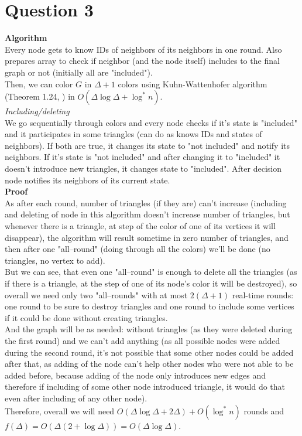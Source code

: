 \documentclass[]{article}
\title{}
\author{}
\begin{document}

\section*{Question 3}
	\textbf{Algorithm}\\
	Every node gets to know IDs of neighbors of its neighbors in one round. Also prepares array to check if neighbor (and the node itself) includes to the final graph or not (initially all are "included").\\
	Then, we can color $G$ in $\Delta+1$ colors using Kuhn-Wattenhofer algorithm (Theorem 1.24, \cite{Ghaffari}) in $O(\Delta\log\Delta + \log^*n)$.\\
	\textit{Including/deleting}\\
	We go sequentially through colors and every node checks if it's state is "included" and it participates in some triangles (can do as knows IDs and states of neighbors). If both are true, it changes its state to "not included" and notify its neighbors. If it's state is "not included" and after changing it to "included" it doesn't introduce new triangles, it changes state to "included". After decision node notifies its neighbors of its current state.\\
	\textbf{Proof}\\
	As after each round, number of triangles (if they are) can't increase (including and deleting of node in this algorithm doesn't increase number of triangles, but whenever there is a triangle, at step of the color of one of its vertices it will disappear), the algorithm will result sometime in zero number of triangles, and then after one "all--round" (doing through all the colors) we'll be done (no triangles, no vertex to add).\\
	But we can see, that even one "all--round" is enough to delete all the triangles (as if there is a triangle, at the step of one of its node's color it will be destroyed), so overall we need only two "all--rounds" with at most $2(\Delta+1)$ real-time rounds: one round to be sure to destroy triangles and one round to include some vertices if it could be done without creating triangles.\\
	And the graph will be as needed: without triangles (as they were deleted during the first round) and we can't add anything (as all possible nodes were added during the second round, it's not possible that some other nodes could be added after that, as adding of the node can't help other nodes who were not able to be added before, because adding of the node only introduces new edges and therefore if including of some other node introduced triangle, it would do that even after including of any other node).\\
	
	Therefore, overall we will need $O(\Delta\log\Delta + 2\Delta) + O(\log^*n)$ rounds and $f(\Delta) = O(\Delta(2 + \log\Delta))=O(\Delta\log\Delta)$.
	


\end{document}
